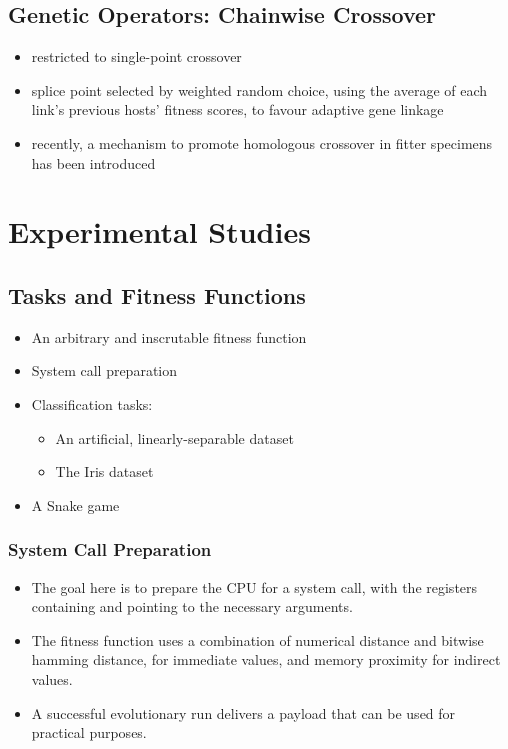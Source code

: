 \documentclass[11pt]{article}
\begin{document}
\subsection*{Genetic Operators: Chainwise Crossover}
\label{sec:org3e94750}
\begin{itemize}
\item restricted to single-point crossover
\item splice point selected by weighted random choice, using the average of each link's previous hosts' fitness scores, to favour adaptive gene linkage
\item recently, a mechanism to promote homologous crossover in fitter specimens has been introduced
\end{itemize}


\section*{Experimental Studies}
\label{sec:org477ad50}

\subsection*{Tasks and Fitness Functions}
\label{sec:org57b2696}
\begin{itemize}
\item An arbitrary and inscrutable fitness function
\item System call preparation
\item Classification tasks:
\begin{itemize}
\item An artificial, linearly-separable dataset
\item The Iris dataset
\end{itemize}
\item A Snake game
\end{itemize}

\subsubsection*{System Call Preparation}
\label{sec:orgc87d45e}

\begin{itemize}
\item The goal here is to prepare the CPU for a system call, with the registers containing and pointing to the necessary arguments.
\item The fitness function uses a combination of numerical distance and bitwise hamming distance, for immediate values, and memory proximity for indirect values.
\item A successful evolutionary run delivers a payload that can be used for practical purposes.
\end{itemize}
\end{document}
